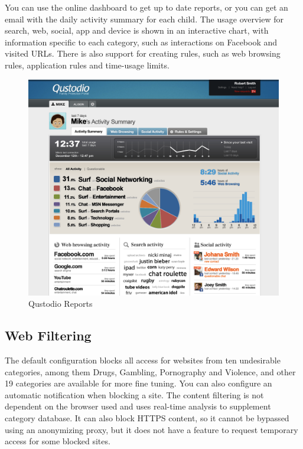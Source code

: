 You can use the online dashboard to get up to date reports, or you can get an email with the daily activity summary for each child. The usage overview for search, web, social, app and device is shown in an interactive chart, with information specific to each category, such as interactions on Facebook and visited URLs. There is also support for creating rules, such as web browsing rules, application rules and time-usage limits.

\begin{figure}[th]
\centering
\includegraphics[width=1\textwidth]{Figures/qustodio}
\decoRule
\caption{Qustodio Reports}
\label{fig:qustodio}
\end{figure}

\subsection{Web Filtering}

The default configuration blocks all access for websites from ten undesirable categories, among them Drugs, Gambling, Pornography and Violence, and other 19 categories are available for more fine tuning. You can also configure an automatic notification when blocking a site. The content filtering is not dependent on the browser used and uses real-time analysis to supplement category database. It can also block HTTPS content, so it cannot be bypassed using an anonymizing proxy, but it does not have a feature to request temporary access for some blocked sites.

